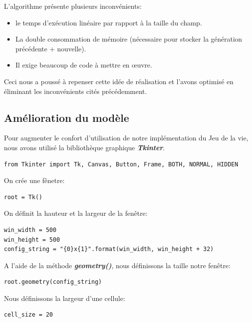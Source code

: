 \documentclass{article}
\begin{document}
\noindent L'algorithme présente plusieurs inconvénients:
\begin{itemize}
\item  le temps d’exécution linéaire par rapport à la taille du champ.
\item La double consommation de mémoire (nécessaire pour stocker la génération précédente + nouvelle).
\item Il exige beaucoup de code à mettre en œuvre.
\end{itemize}

Ceci nous a poussé à repenser cette idée de réalisation et l'avons optimisé en éliminant les inconvénients cités précédemment.\\

\subsection{Amélioration du modèle}

Pour augmenter le confort d'utilisation de notre implémentation du Jeu de la vie, nous avons utilisé la bibliothèque graphique \textbf{\textit{Tkinter}}.

\begin{verbatim}
from Tkinter import Tk, Canvas, Button, Frame, BOTH, NORMAL, HIDDEN
\end{verbatim}

\noindent On crée une fênetre:

\begin{verbatim}
root = Tk()
\end{verbatim}

\noindent On définit la hauteur et la largeur de la fenêtre:

\begin{verbatim}
win_width = 500
win_height = 500
config_string = "{0}x{1}".format(win_width, win_height + 32)
\end{verbatim}

\noindent A l'aide de la méthode \textbf{\textit{geometry()}}, nous définissons la taille notre fenêtre:

\begin{verbatim}
root.geometry(config_string)
\end{verbatim}

\noindent Nous définissons la largeur d'une cellule:

\begin{verbatim}
cell_size = 20
\end{verbatim}
\end{document}
